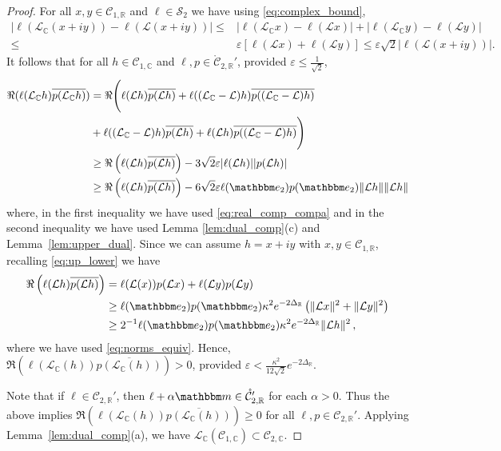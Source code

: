 \documentclass{amsart}
\numberwithin{equation}{section}
\newcommand\cC{{\mathcal C}}
\newcommand\cL{{\mathcal L}}
\newcommand\cS{{\mathcal S}}
\newcommand\bC{{\mathbb C}}
\newcommand\bR{{\mathbb R}}
\newcommand\ve{\varepsilon}
\newcommand{\bbe}{\mathbbm e}
\newcommand{\bbm}{\mathbbm m}
\begin{document}
\begin{proof}
For all $x,y\in \cC_{1,\bR}$ and $\ell\in\cS_2$ we have using \eqref{eq:complex_bound},
\begin{equation}\label{eq:real_comp_compa}
\begin{split}
\left|\ell(\cL_{\bC} (x+iy))-\ell(\cL (x+iy))\right|\leq& \left|\ell(\cL_{\bC} x)-\ell(\cL x)\right|
+\left|\ell(\cL_{\bC} y)-\ell(\cL y)\right|\\
\leq& \ve [\ell(\cL x)+ \ell(\cL y)]\leq \ve  \sqrt 2 |\ell(\cL (x+iy))|.
\end{split}
\end{equation}
It follows that for all $h\in\cC_{1,\bC}$ and $\ell,p\in\mathring\cC_{2,\bR}'$, provided $\ve\leq \frac{1}{\sqrt 2}$,
\[
\begin{split}
\Re(\ell(\cL_{\bC} h)\overline{p(\cL_{\bC} h)})
& =
\Re\Bigg(\ell(\cL h)\overline{p(\cL h)}  + \ell((\cL_{\bC}-\cL) h )\overline{p((\cL_{\bC}-\cL) h )}  \\
& +\ell((\cL_{\bC}-\cL) h)\overline{p(\cL h )}+\ell(\cL h )\overline{p((\cL_{\bC}-\cL) h )} \Bigg)\\
&\geq \Re\left(\ell(\cL h )\overline{p(\cL h)}\right)
- 3 \sqrt 2\ve|\ell(\cL h )||{p(\cL h )}|\\
&\geq \Re\left(\ell(\cL h )\overline{p(\cL h)}\right)
-6\sqrt 2\ve \ell(\bbe_2)p(\bbe_2)\|\cL h\|\|\cL h \|
\end{split}
\]
where, in the first inequality we have used \eqref{eq:real_comp_compa} and in the second inequality we have
used Lemma \ref{lem:dual_comp}(c) and Lemma~\ref{lem:upper_dual}. 
Since we can assume $h=x+iy$ with $x,y\in \cC_{1,\bR}$, recalling \eqref{eq:up_lower} we have
\[
\begin{split}
\Re\left(\ell(\cL h )\overline{p(\cL h )}\right) & = \ell(\cL(x))p(\cL x )+\ell(\cL y )p(\cL y)\\
& \geq \ell(\bbe_2)p(\bbe_2)\kappa^2 e^{-2\Delta_\bR} \left( \|\cL x\|^2 + \|\cL y \|^2 \right) \\
& \geq  2^{-1} \ell(\bbe_2)p(\bbe_2)\kappa^2 e^{-2\Delta_\bR} \| \cL h \|^2 \, , 
\end{split}
\]
where we have used \eqref{eq:norms_equiv}.  Hence, $\Re(\ell(\cL_{\bC}(h))\overline{p(\cL_{\bC}(h))})>0$, provided $\ve < \frac{\kappa^2}{ 12 \sqrt 2}e^{-2\Delta_\bR}$. 

Note that if $\ell \in \cC_{2,\bR}'$, then $\ell+\alpha\bbm\in\mathring\cC_{2,\bR}'$ for each $\alpha>0$.  Thus the above implies $\Re(\ell(\cL_{\bC}(h))\overline{p(\cL_{\bC}(h))}) \ge 0$ for
all $\ell, p \in \cC_{2, \bR}'$. 
Applying Lemma~\ref{lem:dual_comp}(a), 
 we have $\cL_{\bC}(\cC_{1,\bC})\subset \cC_{2,\bC}$.


\end{proof}
\end{document}
